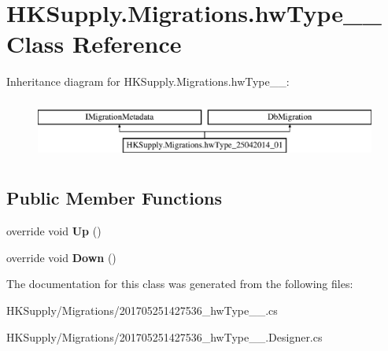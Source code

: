 \hypertarget{class_h_k_supply_1_1_migrations_1_1hw_type__25042014__01}{}\section{H\+K\+Supply.\+Migrations.\+hw\+Type\+\_\+\_ Class Reference}
\label{class_h_k_supply_1_1_migrations_1_1hw_type__25042014__01}
Inheritance diagram for H\+K\+Supply.\+Migrations.\+hw\+Type\+\_\+\_\+:\begin{figure}[H]
\begin{center}
\leavevmode
\includegraphics[height=2.000000cm]{class_h_k_supply_1_1_migrations_1_1hw_type__25042014__01}
\end{center}
\end{figure}
\subsection*{Public Member Functions}
\begin{DoxyCompactItemize}
\item 
\mbox{\label{class_h_k_supply_1_1_migrations_1_1hw_type__25042014__01_afd3cbb3df559c00681e742fb9a2cfdae}} 
override void {\bfseries Up} ()
\item 
\mbox{\label{class_h_k_supply_1_1_migrations_1_1hw_type__25042014__01_a470f86a599171ca2a6ee840ec55a3975}} 
override void {\bfseries Down} ()
\end{DoxyCompactItemize}


The documentation for this class was generated from the following files\+:\begin{DoxyCompactItemize}
\item 
H\+K\+Supply/\+Migrations/201705251427536\+\_\+hw\+Type\+\_\+\_.\+cs\item 
H\+K\+Supply/\+Migrations/201705251427536\+\_\+hw\+Type\+\_\+\_.\+Designer.\+cs\end{DoxyCompactItemize}
